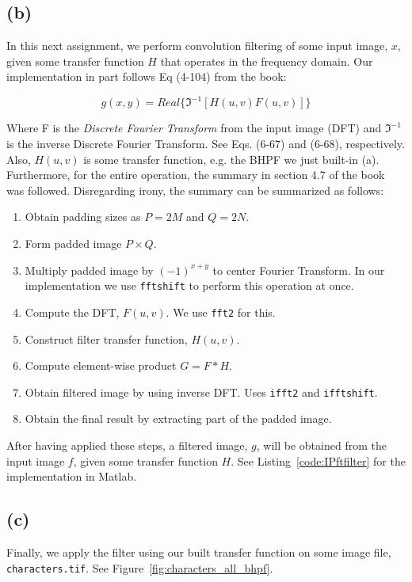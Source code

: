 \documentclass{article}
\begin{document}
\subsection*{(b)} In this next assignment, we perform convolution filtering of some input image, $x$, given some transfer function $H$ that operates in the frequency domain. Our implementation in part follows Eq (4-104) from the book:

\[
g(x, y) = Real\{\Im^{-1}[H(u,v)F(u, v)]\}
\]

Where F is the \textit{Discrete Fourier Transform} from the input image (DFT) and $\Im^{-1}$ is the inverse Discrete Fourier Transform. See Eqs. (6-67) and (6-68), respectively. Also, $H(u, v)$ is some transfer function, e.g. the BHPF we just built-in (a). Furthermore, for the entire operation, the summary in section 4.7 of the book was followed. Disregarding irony, the summary can be summarized as follows:

\begin{enumerate}
    \item Obtain padding sizes as $P = 2M$ and $Q = 2N$.
    \item Form padded image $P \times Q$.
    \item Multiply padded image by $(-1)^{x+y}$ to center Fourier Transform. In our implementation we use \texttt{fftshift} to perform this operation at once.
    \item Compute the DFT, $F(u, v)$. We use \texttt{fft2} for this.
    \item Construct filter transfer function, $H(u, v)$.
    \item Compute element-wise product $G = F * H$.
    \item Obtain filtered image by using inverse DFT. Uses \texttt{ifft2} and \texttt{ifftshift}.
    \item Obtain the final result by extracting part of the padded image.
\end{enumerate}

After having applied these steps, a filtered image, $g$, will be obtained from the input image $f$, given some transfer function $H$. See  Listing~\ref{code:IPftfilter} for the implementation in Matlab.

\subsection*{(c)} Finally, we apply the filter using our built transfer function on some image file, \texttt{characters.tif}. See Figure~\ref{fig:characters_all_bhpf}.
\end{document}
